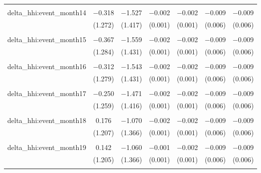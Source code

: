 \begin{table}[H]
{\begin{tabular}{@{\extracolsep{5pt}}lcccccc}
   & & & & & & \\  

  delta\_hhi:event\_month14 & $-$0.318 & $-$1.527 & $-$0.002 & $-$0.002 & $-$0.009 & $-$0.009 \\  

   & (1.272) & (1.417) & (0.001) & (0.001) & (0.006) & (0.006) \\  

   & & & & & & \\  

  delta\_hhi:event\_month15 & $-$0.367 & $-$1.559 & $-$0.002 & $-$0.002 & $-$0.009 & $-$0.009 \\  

   & (1.284) & (1.431) & (0.001) & (0.001) & (0.006) & (0.006) \\  

   & & & & & & \\  

  delta\_hhi:event\_month16 & $-$0.312 & $-$1.543 & $-$0.002 & $-$0.002 & $-$0.009 & $-$0.009 \\  

   & (1.279) & (1.431) & (0.001) & (0.001) & (0.006) & (0.006) \\  

   & & & & & & \\  

  delta\_hhi:event\_month17 & $-$0.250 & $-$1.471 & $-$0.002 & $-$0.002 & $-$0.009 & $-$0.009 \\  

   & (1.259) & (1.416) & (0.001) & (0.001) & (0.006) & (0.006) \\  

   & & & & & & \\  

  delta\_hhi:event\_month18 & 0.176 & $-$1.070 & $-$0.002 & $-$0.002 & $-$0.009 & $-$0.009 \\  

   & (1.207) & (1.366) & (0.001) & (0.001) & (0.006) & (0.006) \\  

   & & & & & & \\  

  delta\_hhi:event\_month19 & 0.142 & $-$1.060 & $-$0.001 & $-$0.002 & $-$0.009 & $-$0.009 \\  

   & (1.205) & (1.366) & (0.001) & (0.001) & (0.006) & (0.006) \\  

   & & & & & & \\  


\end{tabular}}
\end{table}
